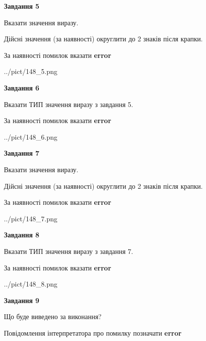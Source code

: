 \documentclass[11pt, ukrainian]{article}
\begin{document}
{\begin {large}
{\begin {center}\textbf{Завдання 5}\end {center}}\par
Вказати значення виразу. \par
Дійсні значення (за наявності) округлити до 2 знаків після крапки. \par
За наявності помилок вказати \textbf{error}

\begin{center}
	{../pict/148_5.png}
\end{center}
\newpage

{\begin {center}\textbf{Завдання 6}\end {center}}\par
Вказати ТИП значення виразу з завдання 5. \par
За наявності помилок вказати \textbf{error}

\begin{center}
	{../pict/148_6.png}
\end{center}
\newpage

{\begin {center}\textbf{Завдання 7}\end {center}}\par
Вказати значення виразу. \par
Дійсні значення (за наявності) округлити до 2 знаків після крапки. \par
За наявності помилок вказати \textbf{error}

\begin{center}
	{../pict/148_7.png}
\end{center}
\newpage

{\begin {center}\textbf{Завдання 8}\end {center}}\par
Вказати ТИП значення виразу з завдання 7. \par
За наявності помилок вказати \textbf{error}

\begin{center}
	{../pict/148_8.png}
\end{center}
\newpage

{\begin {center}\textbf{Завдання 9}\end {center}}\par
Що буде виведено за виконання? \par
Повідомлення інтерпретатора про помилку позначати \textbf{error}


\end{large}}
\end{document}
